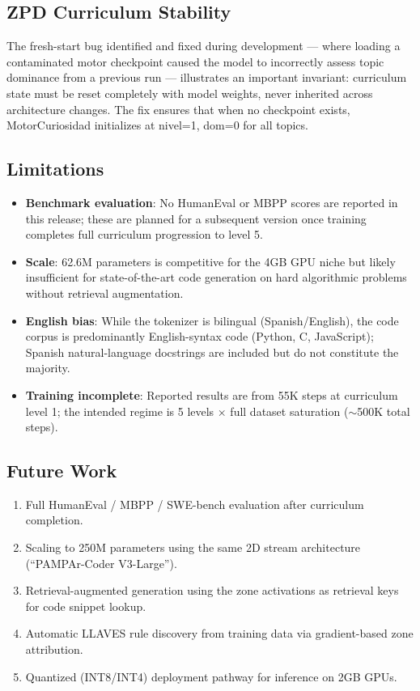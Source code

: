 \documentclass[11pt,a4paper]{article}
\begin{document}
\subsection{ZPD Curriculum Stability}

The fresh-start bug identified and fixed during development —
where loading a contaminated motor checkpoint caused the model to
incorrectly assess topic dominance from a previous run —
illustrates an important invariant: curriculum state must be reset completely
with model weights, never inherited across architecture changes.  The fix
ensures that when no checkpoint exists, MotorCuriosidad initializes at
nivel=1, dom=0 for all topics.

\subsection{Limitations}

\begin{itemize}
    \item \textbf{Benchmark evaluation}: No HumanEval or MBPP scores are
    reported in this release; these are planned for a subsequent version once
    training completes full curriculum progression to level 5.
    \item \textbf{Scale}: 62.6M parameters is competitive for the 4GB GPU
    niche but likely insufficient for state-of-the-art code generation on
    hard algorithmic problems without retrieval augmentation.
    \item \textbf{English bias}: While the tokenizer is bilingual
    (Spanish/English), the code corpus is predominantly English-syntax code
    (Python, C, JavaScript); Spanish natural-language docstrings are included
    but do not constitute the majority.
    \item \textbf{Training incomplete}: Reported results are from 55K steps
    at curriculum level 1; the intended regime is 5 levels $\times$ full
    dataset saturation ($\sim$500K total steps).
\end{itemize}

\subsection{Future Work}

\begin{enumerate}
    \item Full HumanEval / MBPP / SWE-bench evaluation after curriculum
    completion.
    \item Scaling to 250M parameters using the same 2D stream architecture
    (``PAMPAr-Coder V3-Large'').
    \item Retrieval-augmented generation using the zone activations as
    retrieval keys for code snippet lookup.
    \item Automatic LLAVES rule discovery from training data via
    gradient-based zone attribution.
    \item Quantized (INT8/INT4) deployment pathway for inference on 2GB GPUs.
\end{enumerate}
\end{document}
